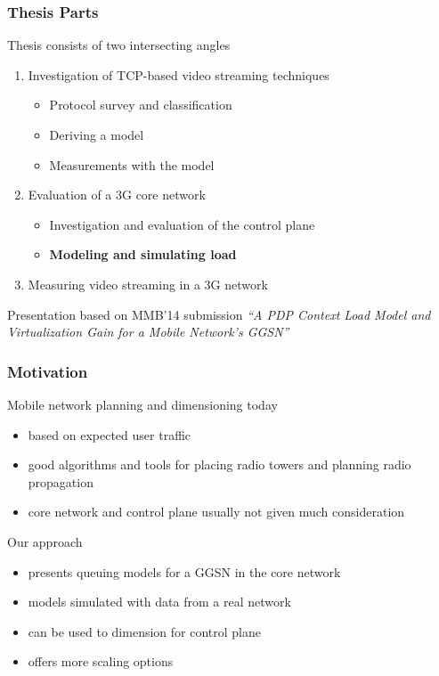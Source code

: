 \documentclass{beamer}
\begin{document}
\begin{frame}
	\frametitle{Thesis Parts}

	Thesis consists of two intersecting angles
	\begin{enumerate}
		\item Investigation of TCP-based video streaming techniques
			\begin{itemize}
				\item Protocol survey and classification
				\item Deriving a model
				\item Measurements with the model
			\end{itemize}
		\item Evaluation of a 3G core network
			\begin{itemize}
				\item Investigation and evaluation of the control plane
				\item \textbf{Modeling and simulating load}
			\end{itemize}
		\item Measuring video streaming in a 3G network 
	\end{enumerate}

	Presentation based on MMB'14 submission \textit{``A PDP Context Load Model and Virtualization
Gain for a Mobile Network's GGSN''}

\end{frame}



\begin{frame}
    \frametitle{Motivation}



	Mobile network planning and dimensioning today
    \begin{itemize}
    	\item based on expected user traffic
		\item good algorithms and tools for placing radio towers and planning radio propagation
		\item core network and control plane usually not given much consideration
	\end{itemize}

	Our approach
	\begin{itemize}
		\item presents queuing models for a GGSN in the core network
		\item models simulated with data from a real network
		\item can be used to dimension for control plane
		\item offers more scaling options
	\end{itemize}

\end{frame}
\end{document}
